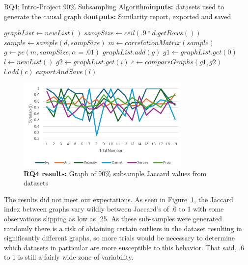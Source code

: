 \documentclass[]{svjour3}
\begin{document}
 
\begin{algorithm}[h!tbp]
\footnotesize
    \caption{RQ4: Intro-Project 90\% Subsampling Algorithm\newline\textbf{inputs: }datasets  used to generate the causal graph d\newline\textbf{outputs: } Similarity report, exported and saved}
    \begin{algorithmic}[1]
            \State $graphList \leftarrow newList()$
            \State $sampSize \leftarrow ceil(.9 * d.getRows())$
                \State $sample \leftarrow sample(d, sampSize)$
                \State $m \leftarrow correlationMatrix(sample)$
                \State $g \leftarrow pc(m, sampSize, \alpha = .01)$
                \State $graphList.add(g)$
            \EndFor
            \State $g1 \leftarrow graphList.get(0)$ 
            \State $l \leftarrow newList()$
                \State $g2 \leftarrow graphList.get(i)$
                \State $c \leftarrow compareGraphs(g1, g2)$
                \State $l.add(c)$
            \EndFor
            \State $exportAndSave(l)$
         \EndFor
    \end{algorithmic}
\end{algorithm}

\begin{figure}[h]
\caption{{\bf RQ4 results:} Graph of 90\% subsample Jaccard values from datasets}\label{Subsample graphs}
\begin{center}
\includegraphics[width=8.5cm]{images/RQ4.png}
\end{center}
\end{figure}

The results did not meet our expectations.
As seen in Figure~\ref{Subsample graphs}, the Jaccard index between graphs vary wildly between Jaccard's of .6 to 1 with some observations slipping as low as .25.  As these sub-samples were generated randomly there is a risk of obtaining certain outliers in the dataset resulting in significantly different graphs, so more trials would be necessary to determine which datasets in particular are more susceptible to this behavior.  That said,   .6 to 1 is still a fairly wide zone of variability.     
\end{document}
